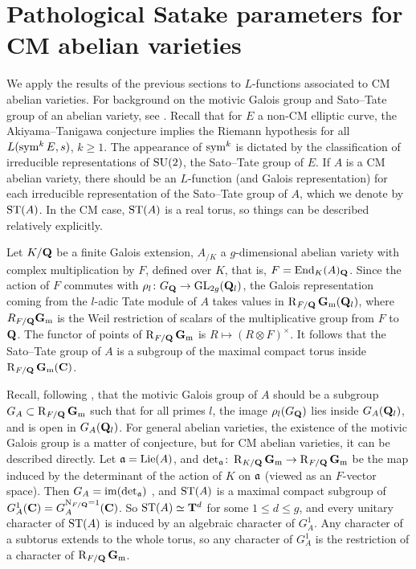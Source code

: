 \section{Pathological Satake parameters for CM abelian varieties}
\label{sec:Satake-CM}

We apply the results of the previous sections to $L$-functions associated to 
CM abelian varieties. For background on the motivic Galois group and Sato--Tate 
group of an abelian variety, see \cite{serre-tate-1968,serre-1994,yu-2015}. 
Recall that for $E$ a non-CM elliptic curve, the 
Akiyama--Tanigawa conjecture implies the Riemann hypothesis for all 
$L(\operatorname{sym}^k E,s)$, $k\geqslant 1$. The appearance of $\operatorname{sym}^k$ is dictated by the 
classification of irreducible representations of $\operatorname{SU}(2)$, the Sato--Tate group 
of $E$. If $A$ is a CM abelian variety, there should be an $L$-function (and 
Galois representation) for each irreducible representation of the Sato--Tate 
group of $A$, which we denote by $\mathrm{ST}(A)$. In the 
CM case, $\mathrm{ST}(A)$ is a real torus, so things can be described relatively 
explicitly. 

Let $K/\mathbf{Q}$ be a finite Galois extension, $A_{/K}$ a $g$-dimensional abelian 
variety with complex multiplication by $F$, defined over $K$, that is, 
$F = \operatorname{End}_K(A)_{\mathbf{Q}}$. Since the action of $F$ commutes with 
$\rho_l\colon G_{\mathbf{Q}} \to \operatorname{GL}_{2g}(\mathbf{Q}_l)$, the Galois representation coming 
from the $l$-adic Tate module of $A$ takes values in $\operatorname{R}_{F/\mathbf{Q}}\mathbf{G}_\mathrm{m}(\mathbf{Q}_l)$, 
where $R_{F/\mathbf{Q}} \mathbf{G}_\mathrm{m}$ is the Weil restriction of scalars of the multiplicative 
group from $F$ to $\mathbf{Q}$. The functor of points of $\operatorname{R}_{F/\mathbf{Q}}\mathbf{G}_\mathrm{m}$ is 
$R\mapsto (R\otimes F)^\times$. It follows that the Sato--Tate group of $A$ is 
a subgroup of the maximal compact torus inside $\operatorname{R}_{F/\mathbf{Q}}\mathbf{G}_\mathrm{m}(\mathbf{C})$. 

Recall, following \cite{serre-1994}, that the motivic Galois group of $A$ 
should be a subgroup $G_A\subset \operatorname{R}_{F/\mathbf{Q}}\mathbf{G}_\mathrm{m}$ such that for all primes $l$, 
the image $\rho_l(G_{\mathbf{Q}})$ lies inside $G_A(\mathbf{Q}_l)$, and is open in 
$G_A(\mathbf{Q}_l)$. For general abelian varieties, the existence of the motivic 
Galois group is a matter of conjecture, but for CM abelian varieties, it can be 
described directly. Let $\mathfrak{a}=\operatorname{Lie}(A)$, and 
$\det_{\mathfrak{a}}\colon \operatorname{R}_{K/\mathbf{Q}}\mathbf{G}_\mathrm{m} \to \operatorname{R}_{F/\mathbf{Q}}\mathbf{G}_\mathrm{m}$ be the map induced by the 
determinant of the action of $K$ on $\mathfrak{a}$ (viewed as an $F$-vector space). Then 
$G_A = \operatorname{im}(\det_{\mathfrak{a}})$ \cite{yu-2015}, and $\mathrm{ST}(A)$ is a maximal compact 
subgroup of $G_A^1(\mathbf{C}) = G_A^{\operatorname{N}_{F/\mathbf{Q}} = 1}(\mathbf{C})$. So 
$\mathrm{ST}(A) \simeq \mathbf{T}^d$ for some $1\leqslant d \leqslant g$, and every 
unitary character of $\mathrm{ST}(A)$ is induced by an algebraic character of 
$G_A^1$. Any character of a subtorus extends to the whole torus, so any 
character of $G_A^1$ is the restriction of a character of $\operatorname{R}_{F/\mathbf{Q}}\mathbf{G}_\mathrm{m}$. 

